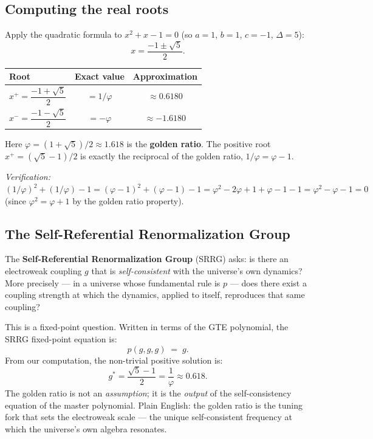 \documentclass[11pt,a4paper]{article}
\newcommand{\term}[1]{\textbf{#1}}
\begin{document}
\subsection{Computing the real roots}

Apply the quadratic formula to $x^2 + x - 1 = 0$ (so $a = 1$, $b = 1$, $c = -1$,
$\Delta = 5$):
\[
  x = \frac{-1 \pm \sqrt{5}}{2}.
\]

\begin{center}
\begin{tabular}{lcc}
\toprule
Root & Exact value & Approximation \\
\midrule
$x^+ = \dfrac{-1+\sqrt{5}}{2}$ & $= 1/\varphi$ & $\approx 0.6180$ \\[8pt]
$x^- = \dfrac{-1-\sqrt{5}}{2}$ & $= -\varphi$  & $\approx -1.6180$ \\
\bottomrule
\end{tabular}
\end{center}

\medskip
Here $\varphi = (1+\sqrt{5})/2 \approx 1.618$ is the \term{golden ratio}.
The positive root $x^+ = (\sqrt{5}-1)/2$ is exactly the reciprocal of the
golden ratio, $1/\varphi = \varphi - 1$.

\noindent\textit{Verification:} $(1/\varphi)^2 + (1/\varphi) - 1
  = (\varphi-1)^2 + (\varphi-1) - 1
  = \varphi^2 - 2\varphi + 1 + \varphi - 1 - 1
  = \varphi^2 - \varphi - 1 = 0$
(since $\varphi^2 = \varphi + 1$ by the golden ratio property). \checkmark

\subsection{The Self-Referential Renormalization Group}

The \term{Self-Referential Renormalization Group} (SRRG) asks: is there an
electroweak coupling $g$ that is \emph{self-consistent} with the universe's
own dynamics?  More precisely — in a universe whose fundamental rule is
$p$ — does there exist a coupling strength at which the dynamics, applied
to itself, reproduces that same coupling?

This is a fixed-point question.  Written in terms of the GTE polynomial,
the SRRG fixed-point equation is:
\[
  p(g, g, g) \;=\; g.
\]
From our computation, the non-trivial positive solution is:
\[
  g^* = \frac{\sqrt{5}-1}{2} = \frac{1}{\varphi} \approx 0.618.
\]
The golden ratio is not an \emph{assumption}; it is the \emph{output} of the
self-consistency equation of the master polynomial.  Plain English: the golden
ratio is the tuning fork that sets the electroweak scale — the unique
self-consistent frequency at which the universe's own algebra resonates.
\end{document}
